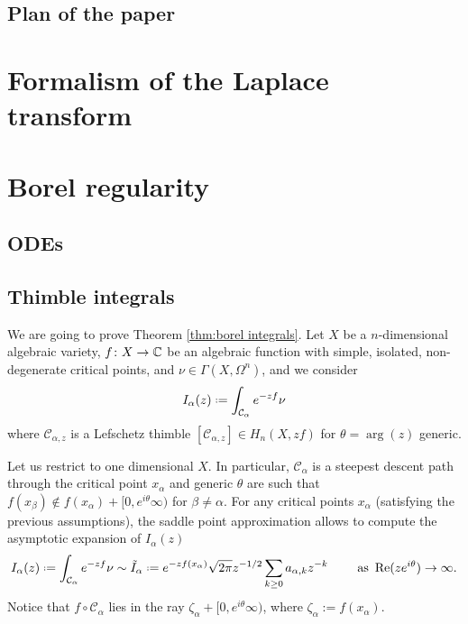 \documentclass[11pt,a4paper,twoside,leqno,noamsfonts]{amsart}
\numberwithin{equation}{section}
\begin{document}
\subsection{Plan of the paper}

\section{Formalism of the Laplace transform}

\section{Borel regularity}

\subsection{ODEs}

\subsection{Thimble integrals}
We are going to prove Theorem \ref{thm:borel integrals}. 
Let $X$ be a $n$-dimensional algebraic variety, $f\colon X\to\mathbb C$ be an algebraic function with simple, isolated, non-degenerate critical points, and $\nu\in\Gamma(X,\Omega^n)$, and we consider
\begin{equation}
I_{\alpha}(z)\defeq\int_{\mathcal{C}_\alpha}e^{-zf}\nu
\end{equation}
where $\mathcal{C}_{\alpha,z}$ is a Lefschetz thimble $[\mathcal{C}_{\alpha,z}]\in H_n(X,zf)$ for $\theta=\arg(z)$ generic. 


Let us restrict to one dimensional $X$. In particular,  $\mathcal{C}_\alpha$ is a steepest descent path through the critical point $x_\alpha$ and generic $\theta$ are such that $f(x_\beta)\notin f(x_\alpha)+[0,e^{i\theta}\infty)$ for $\beta\neq\alpha$. 
For any critical points $x_\alpha$ (satisfying the previous assumptions), the saddle point approximation allows to compute the asymptotic expansion of $I_\alpha(z)$ 
\begin{equation}\label{exp-int}
I_{\alpha}(z)\defeq\int_{\mathcal{C}_\alpha}e^{-zf}\nu\sim \tilde{I}_{\alpha}\defeq e^{-zf(x_\alpha)}\sqrt{2\pi} z^{-1/2}\sum_{k\geq 0}a_{\alpha,k}z^{-k} \qquad \text{ as } \operatorname{Re} (ze^{i\theta})\to\infty.
\end{equation}
Notice that $f \circ \mathcal{C}_\alpha$ lies in the ray $\zeta_\alpha +[0, e^{i\theta}\infty)$, where $\zeta_\alpha := f(x_\alpha)$.
\end{document}
